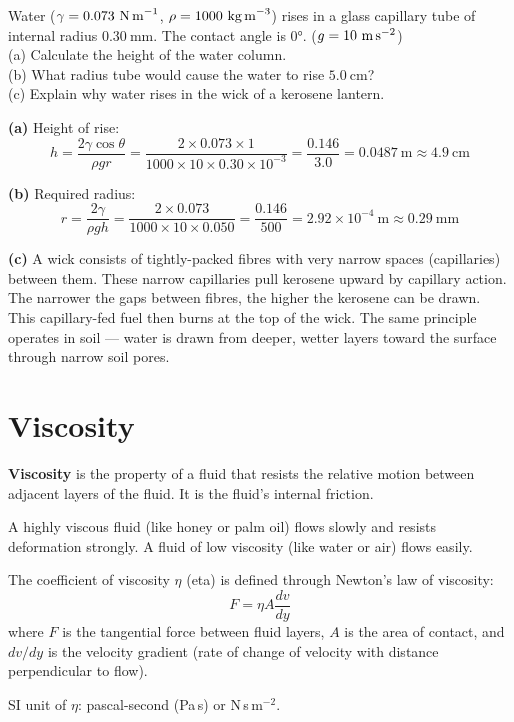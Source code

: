\begin{examplebox}[12.3]
Water ($\gamma = 0.073\ \text{N\,m}^{-1}$,
$\rho = 1000\ \text{kg\,m}^{-3}$) rises in a glass
capillary tube of internal radius $0.30\ \text{mm}$.
The contact angle is $0°$.
($g = 10\ \text{m\,s}^{-2}$)\\
(a) Calculate the height of the water column.\\
(b) What radius tube would cause the water to rise
$5.0\ \text{cm}$?\\
(c) Explain why water rises in the wick of a
kerosene lantern.
\end{examplebox}

\begin{solutionbox}
\textbf{(a)} Height of rise:
\[
  h = \frac{2\gamma\cos\theta}{\rho g r}
  = \frac{2 \times 0.073 \times 1}{1000 \times 10
    \times 0.30\times10^{-3}}
  = \frac{0.146}{3.0}
  = 0.0487\ \text{m} \approx 4.9\ \text{cm}
\]

\textbf{(b)} Required radius:
\[
  r = \frac{2\gamma}{\rho g h}
  = \frac{2 \times 0.073}{1000 \times 10 \times 0.050}
  = \frac{0.146}{500}
  = 2.92\times10^{-4}\ \text{m}
  \approx 0.29\ \text{mm}
\]

\textbf{(c)} A wick consists of tightly-packed fibres
with very narrow spaces (capillaries) between them.
These narrow capillaries pull kerosene upward by
capillary action. The narrower the gaps between
fibres, the higher the kerosene can be drawn. This
capillary-fed fuel then burns at the top of the wick.
The same principle operates in soil --- water is
drawn from deeper, wetter layers toward the surface
through narrow soil pores.
\end{solutionbox}

\section{Viscosity}

\begin{definitionbox}[Viscosity]
\textbf{Viscosity} is the property of a fluid that
resists the relative motion between adjacent layers
of the fluid. It is the fluid's internal friction.

A highly viscous fluid (like honey or palm oil) flows
slowly and resists deformation strongly. A fluid of
low viscosity (like water or air) flows easily.

The coefficient of viscosity $\eta$ (eta) is defined
through Newton's law of viscosity:
\[
  F = \eta A \frac{dv}{dy}
\]
where $F$ is the tangential force between fluid layers,
$A$ is the area of contact, and $dv/dy$ is the
velocity gradient (rate of change of velocity with
distance perpendicular to flow).

SI unit of $\eta$: pascal-second (Pa\,s) or
N\,s\,m$^{-2}$.
\end{definitionbox}

